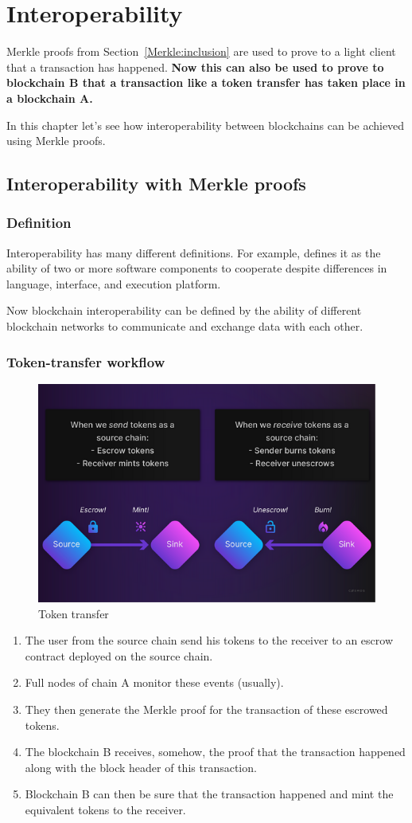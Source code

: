 \chapter{Interoperability}
Merkle proofs from Section~\ref{Merkle:inclusion} are used to prove to a light client that a transaction has happened. 
\textbf{Now this can also be used to prove to blockchain B that a transaction like a token transfer has taken place in a blockchain A.}

In this chapter let's see how interoperability between blockchains can be achieved using Merkle proofs. 

\section{Interoperability with Merkle proofs}
\subsection{Definition}
Interoperability has many different definitions. 
For example, \cite{wegner1996interoperability} defines it as the ability of two or
more software components to cooperate
despite differences in language, 
interface, and execution platform.

Now blockchain interoperability can be defined by the ability of different blockchain networks to communicate and exchange data with each other.


\subsection{Token-transfer workflow}
\begin{figure}[H]
    \centering
    \includegraphics[width=0.5\linewidth]{interoperability/transfer_token.png}
    \caption{Token transfer \cite{tokentransfer}}
    \label{fig:token_transfer}
\end{figure}
\begin{enumerate}
    \item The user from the source chain send his tokens to the receiver to an escrow contract deployed on the source chain. 
    \item Full nodes of chain A monitor these events (usually).
    \item They then generate the Merkle proof for the transaction of these escrowed tokens.
    \item The blockchain B receives, somehow, the proof that the transaction happened along with the block header of this transaction.
    \item Blockchain B can then be sure that the transaction happened and mint the equivalent tokens to the receiver.
\end{enumerate}



